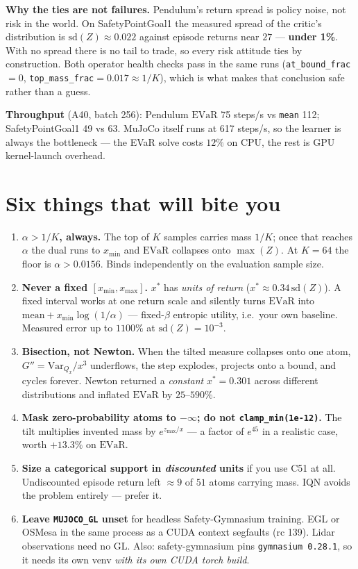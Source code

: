 \documentclass[10pt,a4paper]{article}
\newcommand{\evar}{\mathrm{EVaR}}
\begin{document}
\textbf{Why the ties are not failures.} Pendulum's return spread is policy noise,
not risk in the world. On SafetyPointGoal1 the measured spread of the critic's
distribution is $\mathrm{sd}(Z)\approx 0.022$ against episode returns near $27$ ---
\textbf{under 1\%}. With no spread there is no tail to trade, so every risk attitude
ties by construction. Both operator health checks pass in the same runs
(\texttt{at\_bound\_frac}$=0$, \texttt{top\_mass\_frac}$=0.017\approx 1/K$), which is
what makes that conclusion safe rather than a guess.

\textbf{Throughput} (A40, batch 256): Pendulum $\evar$ 75 steps/s vs \texttt{mean}
112; SafetyPointGoal1 49 vs 63. MuJoCo itself runs at 617 steps/s, so the learner is
always the bottleneck --- the EVaR solve costs $12\%$ on CPU, the rest is GPU
kernel-launch overhead.

\section{Six things that will bite you}

\begin{enumerate}[leftmargin=1.4em,itemsep=0.25em]
\item \textbf{$\alpha > 1/K$, always.} The top of $K$ samples carries mass $1/K$;
      once that reaches $\alpha$ the dual runs to $x_{\min}$ and $\evar$ collapses
      onto $\max(Z)$. At $K=64$ the floor is $\alpha>0.0156$. Binds independently on
      the evaluation sample size.
\item \textbf{Never a fixed $[x_{\min},x_{\max}]$.} $x^\ast$ has \emph{units of
      return} ($x^\ast\approx 0.34\,\mathrm{sd}(Z)$). A fixed interval works at one
      return scale and silently turns $\evar$ into
      $\text{mean} + x_{\min}\log(1/\alpha)$ --- fixed-$\beta$ entropic utility,
      i.e.\ your own baseline. Measured error up to $1100\%$ at
      $\mathrm{sd}(Z)=10^{-3}$.
\item \textbf{Bisection, not Newton.} When the tilted measure collapses onto one
      atom, $G''=\mathrm{Var}_{Q_x}/x^3$ underflows, the step explodes, projects onto
      a bound, and cycles forever. Newton returned a \emph{constant} $x^\ast=0.301$
      across different distributions and inflated $\evar$ by $25$--$590\%$.
\item \textbf{Mask zero-probability atoms to $-\infty$; do not
      \texttt{clamp\_min(1e-12)}.} The tilt multiplies invented mass by
      $e^{z_{\max}/x}$ --- a factor of $e^{45}$ in a realistic case, worth $+13.3\%$
      on $\evar$.
\item \textbf{Size a categorical support in \emph{discounted} units} if you use
      C51 at all. Undiscounted episode return left $\approx 9$ of $51$ atoms
      carrying mass. IQN avoids the problem entirely --- prefer it.
\item \textbf{Leave \texttt{MUJOCO\_GL} unset} for headless Safety-Gymnasium
      training. EGL or OSMesa in the same process as a CUDA context segfaults
      (rc 139). Lidar observations need no GL. Also: safety-gymnasium pins
      \texttt{gymnasium 0.28.1}, so it needs its own venv \emph{with its own CUDA
      torch build}.
\end{enumerate}
\end{document}
